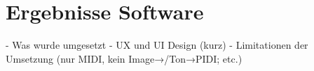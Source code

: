 
\chapter{Ergebnisse Software} \label{ergebnisseSW}

\nocite{*}
- Was wurde umgesetzt
- UX und UI Design (kurz)
- Limitationen der Umsetzung (nur MIDI, kein Image→/Ton→PIDI; etc.)